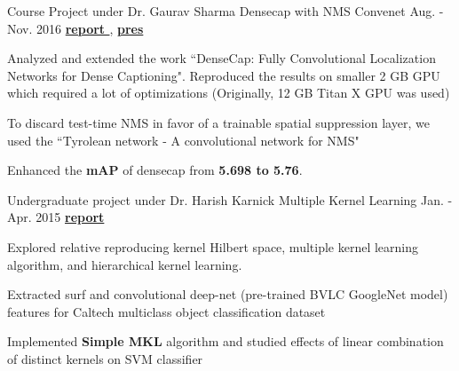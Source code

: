 \begin{cventries}
	\cventry
	{Course Project under Dr. Gaurav Sharma} %
	{Densecap with NMS Convenet} %
	{Aug. - Nov. 2016} %
	{
		\textbf{\href{https://www.dropbox.com/s/5jidhqmthy9ks06/cs698-final-report-extended.pdf?dl=0}{report \ExternalLink}},
		\textbf{\href{https://www.dropbox.com/s/byn2z4o4yiwf00b/CS698\%20Final\%20PPT.pdf?dl=0}{pres \ExternalLink}}
	} %
	{
		\begin{cvitems} %
			\item {Analyzed and extended the work ``DenseCap: Fully Convolutional Localization Networks for Dense Captioning". Reproduced the results on smaller 2 GB GPU which required a lot of optimizations (Originally, 12 GB Titan X GPU was used)}
			\item To discard test-time NMS in favor of a trainable spatial suppression layer, we used the ``Tyrolean network - A convolutional network for NMS"
			\item {Enhanced the \textbf{mAP} of densecap from \textbf{5.698 to 5.76}.}
		\end{cvitems}
	}
	
	\cventry
	{Undergraduate project under Dr. Harish Karnick} %
	{Multiple Kernel Learning} %
	{Jan. - Apr. 2015} %
	{\href{https://www.dropbox.com/s/dg987vl0zdfh6kj/cs396-graduate-project.pdf?dl=0}{\textbf{report \ExternalLink}}} %
	{
		\begin{cvitems} %
			 \item {Explored relative reproducing kernel Hilbert space, multiple kernel learning algorithm, and hierarchical kernel learning.}
			 \item {Extracted surf and convolutional deep-net (pre-trained BVLC GoogleNet model) features for Caltech multiclass object classification dataset}
			 \item {Implemented \textbf{Simple MKL} algorithm and studied effects of linear combination of distinct kernels on SVM classifier}
		\end{cvitems}
	}
	

\end{cventries}
